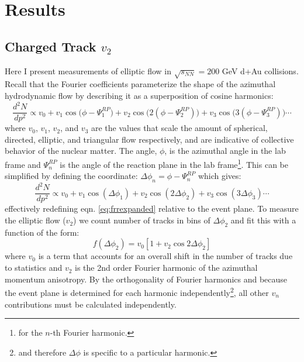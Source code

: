 
\chapter{Results} %
\section{Charged Track $v_{2}$}
\label{sect:alltracks}
Here I present measurements of elliptic flow in $\sqrt{s_{NN}}=200$ GeV d+Au collisions. Recall that the Fourier coefficients parameterize the shape of the azimuthal hydrodynamic flow by describing it as a superposition of cosine harmonics:
\begin{equation} \label{eq:frrexpanded}
\frac{d^{2}N}{dp^{2}} \propto v_0 + v_1 \cos\big(\phi - \Psi^{RP}_1\big) + v_2 \cos\big(2(\phi - \Psi^{RP}_2)\big) + v_3 \cos\big(3(\phi - \Psi^{RP}_3)\big) \cdots
\end{equation}
where $v_0$, $v_1$, $v_2$, and $v_3$ are the values that scale the amount of spherical, directed, elliptic, and triangular flow respectively, and are indicative of collective behavior of the nuclear matter. The angle, $\phi$, is the azimuthal angle in the lab frame and $\Psi^{RP}_n$ is the angle of the reaction plane in the lab frame\footnote{for the $n$-th Fourier harmonic.}. This can be simplified by defining the coordinate: $\Delta \phi_n = \phi - \Psi^{RP}_n$ which gives:
\begin{equation} 
\frac{d^{2}N}{dp^{2}} \propto v_0 + v_1 \cos(\Delta \phi _1) + v_2 \cos(2\Delta \phi _2) + v_3 \cos(3\Delta \phi _3) \cdots
\end{equation}
effectively redefining eqn. \ref{eq:frrexpanded} relative to the event plane. To measure the elliptic flow ($v_2$) we count number of tracks in bins of $\Delta \phi_2$ and fit this with a function of the form:
\begin{equation}
\label{v2fitfn}
f(\Delta \phi_2) = v_0 [1 + v_2 \cos 2 \Delta \phi_2]
\end{equation}
where $v_0$ is a term that accounts for an overall shift in the number of tracks due to statistics and $v_2$ is the 2nd order Fourier harmonic of the azimuthal momentum anisotropy. By the orthogonality of Fourier harmonics and because the event plane is determined for each harmonic independently\footnote{and therefore $\Delta \phi$ is specific to a particular harmonic.}, all other $v_n$ contributions must be calculated independently.


